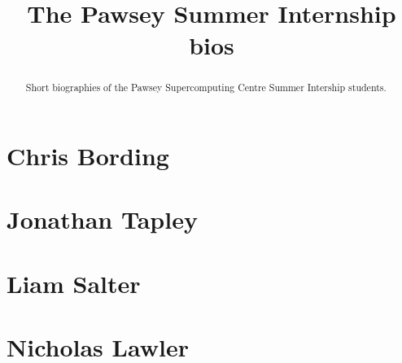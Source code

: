 \documentclass[11pt,a4paper]{report}
\title{The Pawsey Summer Internship bios}
\begin{document}
\maketitle
\tableofcontents


\begin{abstract}

Short biographies of the Pawsey Supercomputing Centre Summer Intership students.

\end{abstract}

\chapter{Chris Bording}


\chapter{Jonathan Tapley}


\chapter{Liam Salter}


\chapter{Nicholas Lawler}

\end{document}
